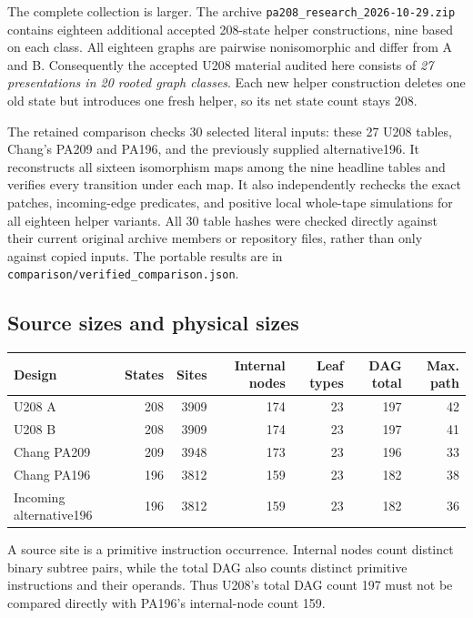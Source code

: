 The complete collection is larger. The archive
\texttt{pa208\_research\_2026-10-29.zip} contains eighteen additional
accepted 208-state helper constructions, nine based on each class.
All eighteen graphs are pairwise nonisomorphic and differ from A and B.
Consequently the accepted U208 material audited here consists of
\emph{27 presentations in 20 rooted graph classes}. Each new helper
construction deletes one old state but introduces one fresh helper, so
its net state count stays 208.

The retained comparison checks 30 selected literal inputs: these 27 U208
tables, Chang's PA209 and PA196, and the previously supplied alternative196.
It reconstructs all sixteen isomorphism maps among the nine headline
tables and verifies every transition under each map. It also independently
rechecks the exact patches, incoming-edge predicates, and positive local
whole-tape simulations for all eighteen helper variants. All 30 table
hashes were checked directly against their current original archive
members or repository files, rather than only against copied inputs.
The portable results are in \texttt{comparison/verified\_comparison.json}.

\subsection{Source sizes and physical sizes}

\begin{center}\small
\begin{tabular}{lrrrrrr}
\hline
Design & States & Sites & Internal nodes & Leaf types & DAG total & Max. path\\
\hline
U208 A &208&3909&174&23&197&42\\
U208 B &208&3909&174&23&197&41\\
Chang PA209 &209&3948&173&23&196&33\\
Chang PA196 &196&3812&159&23&182&38\\
Incoming alternative196 &196&3812&159&23&182&36\\
\hline
\end{tabular}
\end{center}

A source site is a primitive instruction occurrence. Internal nodes count
distinct binary subtree pairs, while the total DAG also counts distinct
primitive instructions and their operands. Thus U208's total DAG count
197 must not be compared directly with PA196's internal-node count 159.

